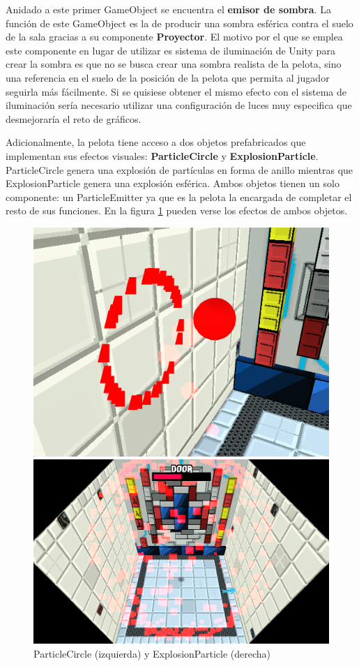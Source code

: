 Anidado a este primer GameObject se encuentra el \textbf{emisor de sombra}. La función de este GameObject es la de producir una sombra esférica contra el suelo de la sala gracias a su componente \textbf{Proyector}. El motivo por el que se emplea este componente en lugar de utilizar es sistema de iluminación de Unity para crear la sombra es que no se busca crear una sombra realista de la pelota, sino una referencia en el suelo de la posición de la pelota que permita al jugador seguirla más fácilmente. Si se quisiese obtener el mismo efecto con el sistema de iluminación sería necesario utilizar una configuración de luces muy especifica que desmejoraría el reto de gráficos.

Adicionalmente, la pelota tiene acceso a dos objetos prefabricados que implementan sus efectos visuales: \textbf{ParticleCircle} y \textbf{ExplosionParticle}. ParticleCircle genera una explosión de partículas en forma de anillo mientras que ExplosionParticle genera una explosión esférica. Ambos objetos tienen un solo componente: un ParticleEmitter ya que es la pelota la encargada de completar el resto de sus funciones. En la figura \ref{particles} pueden verse los efectos de ambos objetos.
\begin{figure}[!htb]
   \begin{minipage}{0.48\textwidth}
     \centering
     \includegraphics[width=0.8\linewidth, right]{images/estructura/fisica/ball_hit}
   \end{minipage}\hfill
   \begin {minipage}{0.48\textwidth}
     \centering
     \includegraphics[width=0.8\linewidth, left]{images/estructura/fisica/ball_explosion}
   \end{minipage}
   \caption{ParticleCircle (izquierda) y ExplosionParticle (derecha)}
   \label{particles}
\end{figure}

